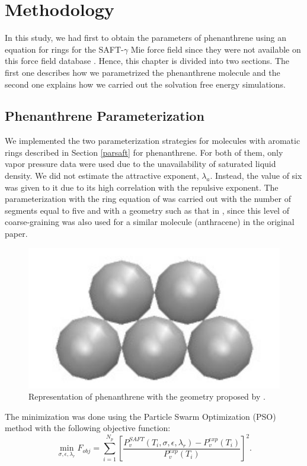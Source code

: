 \chapter{Methodology} %

\label{Chapter4} %

In this study, we had first to obtain the parameters of phenanthrene using an equation for rings for the SAFT-$\gamma$ Mie force field since they were not available on this force field database \cite{ervik2016}. Hence, this chapter is divided into two sections. The first one describes how we parametrized the phenanthrene molecule and the second one explains how we carried out the solvation free energy simulations. 

\section{Phenanthrene Parameterization}\label{parame}

We implemented the two parameterization strategies for molecules with aromatic rings described in Section \ref{parsaft} for phenanthrene. For both of them, only vapor pressure data \cite{pvphen} were used due to the unavailability of saturated liquid density. We did not estimate the attractive exponent, $\lambda _{a}$. Instead, the value of six was given to it due to its high correlation with the repulsive exponent. The parameterization with the ring equation of  was carried out with the number of segments equal to five and with a geometry such as that in , since this level of coarse-graining was also used for a similar molecule (anthracene) in the original paper.
\begin{figure}[th]
	\centering
	\includegraphics[width=0.25\linewidth]{Figures/fen5}
	\caption{Representation of phenanthrene with the geometry proposed by . }
	\label{fig:fen5}
\end{figure}

The minimization was done using the Particle Swarm Optimization (PSO)  method \cite{pso} with the following objective function:
\begin{equation}
\min\limits_{\sigma,\epsilon,\lambda_{r}} F_{obj} = \sum_{i=1}^{N_{p}} \left[\frac{P_{v}^{SAFT}(T_{i},\sigma,\epsilon,\lambda_{r})-P_{v}^{exp}(T_{i})}{P_{v}^{exp}(T_{i})} \right]^2 .
\label{eqn:fobjm}
\end{equation}

